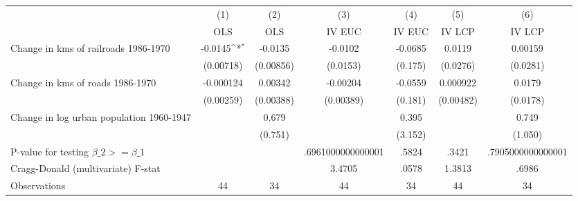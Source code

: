 {
\def\sym#1{\ifmmode^{#1}\else\(^{#1}\)\fi}
\begin{tabular}{l*{6}{c}}
\hline\hline
                &\multicolumn{1}{c}{(1)}&\multicolumn{1}{c}{(2)}&\multicolumn{1}{c}{(3)}&\multicolumn{1}{c}{(4)}&\multicolumn{1}{c}{(5)}&\multicolumn{1}{c}{(6)}\\
                &\multicolumn{1}{c}{OLS}&\multicolumn{1}{c}{OLS}&\multicolumn{1}{c}{IV EUC}&\multicolumn{1}{c}{IV EUC}&\multicolumn{1}{c}{IV LCP}&\multicolumn{1}{c}{IV LCP}\\
\hline
Change in kms of railroads 1986-1970&  -0.0145\sym{*}  &  -0.0135         &  -0.0102         &  -0.0685         &   0.0119         &  0.00159         \\
                &(0.00718)         &(0.00856)         & (0.0153)         &  (0.175)         & (0.0276)         & (0.0281)         \\
[1em]
Change in kms of roads 1986-1970&-0.000124         &  0.00342         & -0.00204         &  -0.0559         & 0.000922         &   0.0179         \\
                &(0.00259)         &(0.00388)         &(0.00389)         &  (0.181)         &(0.00482)         & (0.0178)         \\
[1em]
Change in log urban population 1960-1947&                  &    0.679         &                  &    0.395         &                  &    0.749         \\
                &                  &  (0.751)         &                  &  (3.152)         &                  &  (1.050)         \\
\hline
P-value for testing $\beta\_{2} >= \beta\_{1}$&                  &                  &.6961000000000001         &    .5824         &    .3421         &.7905000000000001         \\
Cragg-Donald (multivariate) F-stat&                  &                  &   3.4705         &    .0578         &   1.3813         &    .6986         \\
Observations    &       44         &       34         &       44         &       34         &       44         &       34         \\
\hline\hline
\end{tabular}
}

